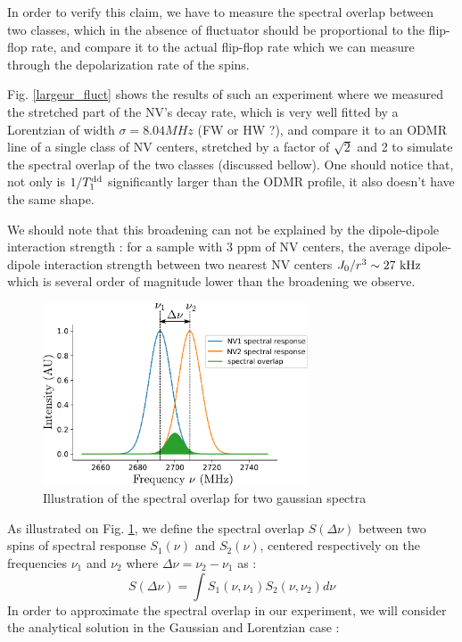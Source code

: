 \documentclass[preprintnumbers,amsmath,amssymb,onecolumn,12pt]{revtex4-2}\usepackage{graphicx}%
\begin{document}
In order to verify this claim, we have to measure the spectral overlap between two classes, which in the absence of fluctuator should be proportional to the flip-flop rate, and compare it to the actual flip-flop rate which we can measure through the depolarization rate of the spins.

Fig. \ref{largeur_fluct} shows the results of such an experiment where we measured the stretched part of the NV's decay rate, which is very well fitted by a Lorentzian of width $\sigma=8.04 MHz$ (FW or HW ?), and compare it to an ODMR line of a single class of NV centers, stretched by a factor of $\sqrt{2}$ and 2 to simulate the spectral overlap of the two classes (discussed bellow). One should notice that, not only is $1/T_1^{\rm dd}$ significantly larger than the ODMR profile, it also doesn't have the same shape. 

We should note that this broadening can not be explained by the dipole-dipole interaction strength : for a sample with 3 ppm of NV centers, the average dipole-dipole interaction strength between two nearest NV centers $J_0/r^3 \sim 27\ \rm kHz$ which is several order of magnitude lower than the broadening we observe. 

\begin{figure}
\includegraphics[width=0.7\textwidth]{Figures_SI/overlap}
\caption{Illustration of the spectral overlap for two gaussian spectra}
\label{overlap}
\end{figure}

As illustrated on Fig. \ref{overlap}, we define the spectral overlap $S(\Delta \nu)$ between two spins of spectral response $S_1(\nu)$ and $S_2(\nu)$, centered respectively on the frequencies $\nu_1$ and $\nu_2$ where $\Delta \nu = \nu_2-\nu_1$ as :
\begin{equation}
S(\Delta \nu)=\int S_1(\nu, \nu_1)S_2(\nu, \nu_2) d\nu
\end{equation}
In order to approximate the spectral overlap in our experiment, we will consider the analytical solution in the Gaussian and Lorentzian case :
\end{document}
